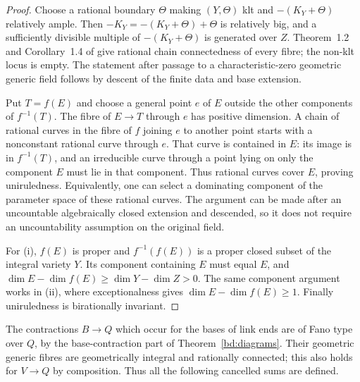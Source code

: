 \begin{proof}
Choose a rational boundary $\Theta$ making $(Y,\Theta)$ klt and
$-(K_Y+\Theta)$ relatively ample. Then
$-K_Y=-(K_Y+\Theta)+\Theta$ is relatively big, and a sufficiently divisible
multiple of $-(K_Y+\Theta)$ is generated over $Z$.
Theorem~1.2 and Corollary~1.4 of \cite{HM07Vertical} give rational chain
connectedness of every fibre; the non-klt locus is empty.
The statement after passage to a characteristic-zero geometric generic
field follows by descent of the finite data and base extension.

Put $T=f(E)$ and choose a general point $e$ of $E$ outside the other
components of $f^{-1}(T)$.  The fibre of $E\to T$ through $e$ has
positive dimension.  A chain of rational curves in the fibre of $f$
joining $e$ to another point starts with a nonconstant rational curve
through $e$.  That curve is contained in $E$: its image is in
$f^{-1}(T)$, and an irreducible curve through a point lying on only the
component $E$ must lie in that component.  Thus rational curves cover
$E$, proving uniruledness.  Equivalently, one can select a dominating
component of the parameter space of these rational curves.  The
argument can be made after an uncountable algebraically closed
extension and descended, so it does not require an uncountability
assumption on the original field.

For (i), $f(E)$ is proper and $f^{-1}(f(E))$ is a proper closed subset
of the integral variety $Y$.  Its component containing $E$ must equal
$E$, and
$\dim E-\dim f(E)\ge\dim Y-\dim Z>0$.  The same component argument
works in (ii), where exceptionalness gives
$\dim E-\dim f(E)\ge1$.  Finally uniruledness is birationally
invariant.
\end{proof}

The contractions $B\to Q$ which occur for the bases of link ends are
of Fano type over $Q$, by the base-contraction part of
Theorem~\ref{bd:diagrams}.  Their geometric generic fibres are
geometrically integral and rationally connected; this also holds for
$V\to Q$ by composition.  Thus all the following cancelled sums are
defined.

